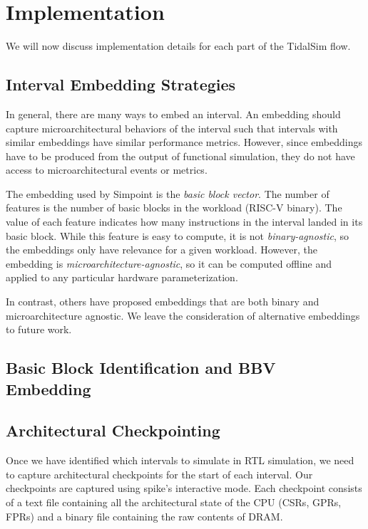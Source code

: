 \documentclass[sigplan,nonacm,10pt]{acmart}
\begin{document}
\section{Implementation}

We will now discuss implementation details for each part of the TidalSim flow.

\subsection{Interval Embedding Strategies}

In general, there are many ways to embed an interval.
An embedding should capture microarchitectural behaviors of the interval such that intervals with similar embeddings have similar performance metrics.
However, since embeddings have to be produced from the output of functional simulation, they do not have access to microarchitectural events or metrics.

The embedding used by Simpoint is the \textit{basic block vector}.
The number of features is the number of basic blocks in the workload (RISC-V binary).
The value of each feature indicates how many instructions in the interval landed in its basic block.
While this feature is easy to compute, it is not \textit{binary-agnostic}, so the embeddings only have relevance for a given workload.
However, the embedding is \textit{microarchitecture-agnostic}, so it can be computed offline and applied to any particular hardware parameterization.

In contrast, others have proposed embeddings that are both binary and microarchitecture agnostic\cite{nps}.
We leave the consideration of alternative embeddings to future work.


\subsection{Basic Block Identification and BBV Embedding}

\subsection{Architectural Checkpointing}

Once we have identified which intervals to simulate in RTL simulation, we need to capture architectural checkpoints for the start of each interval.
Our checkpoints are captured using spike's interactive mode.
Each checkpoint consists of a text file containing all the architectural state of the CPU (CSRs, GPRs, FPRs) and a binary file containing the raw contents of DRAM.
\end{document}
